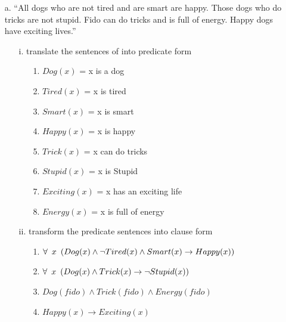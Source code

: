 \documentclass[11pt]{article}
\begin{document}
\begin{flushleft}
\begin{enumerate}
    \item[a.] “All dogs who are not tired and are smart are happy.  Those dogs
        who do tricks are not stupid.  Fido can do tricks and is full of
        energy.  Happy dogs have exciting lives.”

        \begin{enumerate}
            \item[i.] translate the sentences of into predicate form

                \begin{enumerate}
                    \item[1.] $Dog(x)$ = x is a dog
                    \item[2.] $Tired(x)$ = x is tired
                    \item[3.] $Smart(x)$ = x is smart
                    \item[4.] $Happy(x)$ = x is happy
                    \item[5.] $Trick(x)$ = x can do tricks
                    \item[6.] $Stupid(x)$ = x is Stupid
                    \item[7.] $Exciting(x)$ = x has an exciting life
                    \item[8.] $Energy(x)$ = x is full of energy
                \end{enumerate}

            \item[ii.] transform the predicate sentences into clause form

                \begin{enumerate}
                    \item[1.] $\forall \hspace{0.5em} x \hspace{0.5em}
                        (Dog(x) \wedge \neg Tired(x) \wedge Smart(x) \rightarrow
                        Happy(x))$
                    \item[2.] $\forall \hspace{0.5em} x \hspace{0.5em}
                        (Dog(x) \wedge Trick(x) \rightarrow \neg Stupid(x))$
                    \item[3.] $Dog(fido) \wedge Trick(fido) \wedge Energy(fido)$
                    \item[4.] $Happy(x) \rightarrow Exciting(x)$
                \end{enumerate}


\end{enumerate}
\end{enumerate}
\end{flushleft}
\end{document}
